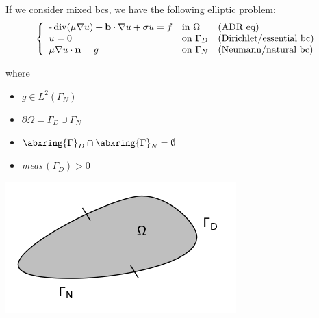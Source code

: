 If we consider mixed bcs, we have the following elliptic problem:
\begin{equation}
\label{eqn:ADRproblem}
\left\{
\begin{array}{lll}
\text{-}\operatorname{div}( \mu \nabla u )+\mathbf{b}\cdot\nabla u+\sigma u=f &\text{in }\Omega & \text{(ADR eq)} \\
u=0 &\text{on }\Gamma_D & \text{(Dirichlet/essential bc)} \\
\mu \nabla u \cdot \mathbf{n} = g & \text{on }\Gamma_N & \text{(Neumann/natural bc)}
\end{array}
\right.
\end{equation}

where 

\newlength{\oldcolumnseprule}

\setlength{\oldcolumnseprule}{\columnseprule}

\setlength{\columnseprule}{0pt} %

\begin{multicols*}{2}
\begin{itemize}
\item $g\in L^2\!\left(\Gamma_N\right)$
\item $\partial\Omega=\Gamma_D \cup \Gamma_N$
\item $\abxring{\Gamma}_D\cap\abxring{\Gamma}_N=\emptyset$
\item \emph{meas}$\,\left(\Gamma_D\right)>0$
\end{itemize}
\begin{Figure}
    \centering
    \includegraphics[width=0.8\linewidth]{images/tr3}
\end{Figure}
\end{multicols*}

\setlength{\columnseprule}{\oldcolumnseprule}


